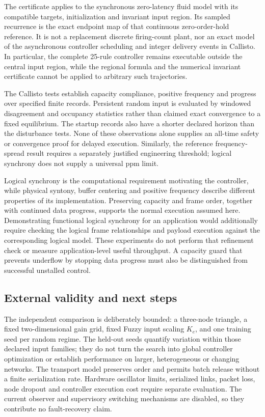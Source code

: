 The certificate applies to the synchronous zero-latency fluid model with
its compatible targets, initialization and invariant input region.
Its sampled recurrence is the exact endpoint map of that continuous
zero-order-hold reference. It is not a replacement discrete firing-count
plant, nor an exact model of the asynchronous controller scheduling
and integer delivery events in Callisto. In particular, the
complete 25-rule controller remains executable outside the central
input region, while the regional formula and the numerical invariant
certificate cannot be applied to arbitrary such trajectories.

The Callisto tests establish capacity compliance, positive frequency and
progress over specified finite records. Persistent random input is
evaluated by windowed disagreement and occupancy statistics rather
than claimed exact convergence to a fixed equilibrium. The startup
records also have a shorter declared horizon than the disturbance
tests. None of these observations alone supplies an all-time safety
or convergence proof for delayed execution. Similarly, the reference
frequency-spread result requires a separately justified engineering
threshold; logical synchrony does not supply a universal ppm limit.

Logical synchrony is the computational requirement motivating the
controller, while physical syntony, buffer centering and positive
frequency describe different properties of its implementation.
Preserving capacity and frame order, together with continued data
progress, supports the normal execution assumed here. Demonstrating
functional logical synchrony for an application would additionally
require checking the logical frame relationships and payload execution
against the corresponding logical model. These experiments do not
perform that refinement check or measure application-level useful
throughput. A capacity guard that prevents underflow by stopping data
progress must also be distinguished from successful unstalled control.

\subsection{External validity and next steps}
\label{detail:subsec:discussion_future}

The independent comparison is deliberately bounded: a three-node
triangle, a fixed two-dimensional gain grid, fixed Fuzzy input scaling
$K_e$, and one training seed per random regime. The held-out seeds
quantify variation within those declared input families; they do not
turn the search into global controller optimization or establish
performance on larger, heterogeneous or changing networks. The
transport model preserves order and permits batch release without a
finite serialization rate. Hardware oscillator limits, serialized
links, packet loss, node dropout and controller execution cost require
separate evaluation. The current observer and supervisory switching
mechanisms are disabled, so they contribute no fault-recovery claim.

